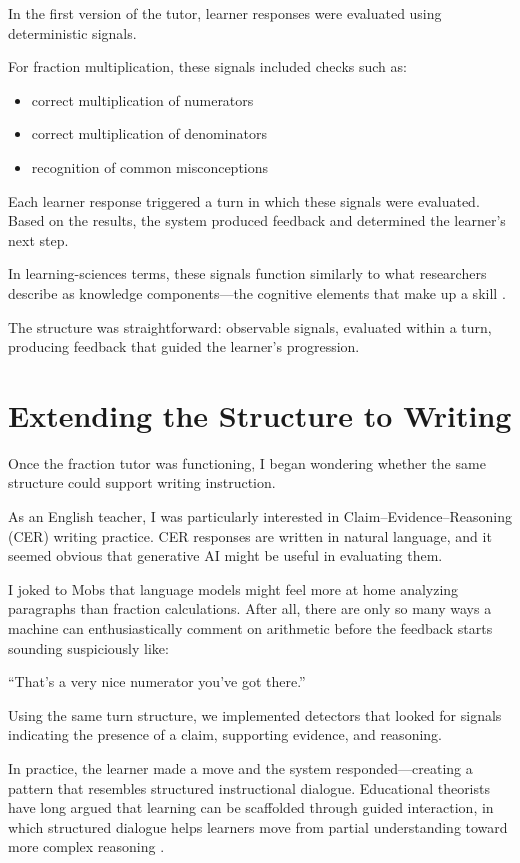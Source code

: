 \documentclass[11pt]{article}
\begin{document}
In the first version of the tutor, learner responses were evaluated using deterministic signals.

For fraction multiplication, these signals included checks such as:

\begin{itemize}
\item correct multiplication of numerators
\item correct multiplication of denominators
\item recognition of common misconceptions
\end{itemize}

Each learner response triggered a turn in which these signals were evaluated. Based on the results, the system produced feedback and determined the learner’s next step.

In learning-sciences terms, these signals function similarly to what researchers describe as knowledge components—the cognitive elements that make up a skill \citep{koedinger2012}.

The structure was straightforward: observable signals, evaluated within a turn, producing feedback that guided the learner’s progression.


\section{Extending the Structure to Writing}

Once the fraction tutor was functioning, I began wondering whether the same structure could support writing instruction.

As an English teacher, I was particularly interested in Claim–Evidence–Reasoning (CER) writing practice. CER responses are written in natural language, and it seemed obvious that generative AI might be useful in evaluating them.

I joked to Mobs that language models might feel more at home analyzing paragraphs than fraction calculations. After all, there are only so many ways a machine can enthusiastically comment on arithmetic before the feedback starts sounding suspiciously like:

“That’s a very nice numerator you’ve got there.”

Using the same turn structure, we implemented detectors that looked for signals indicating the presence of a claim, supporting evidence, and reasoning.

In practice, the learner made a move and the system responded—creating a pattern that resembles structured instructional dialogue. Educational theorists have long argued that learning can be scaffolded through guided interaction, in which structured dialogue helps learners move from partial understanding toward more complex reasoning \citep{vygotsky1978,bruner1976}. 
\end{document}
